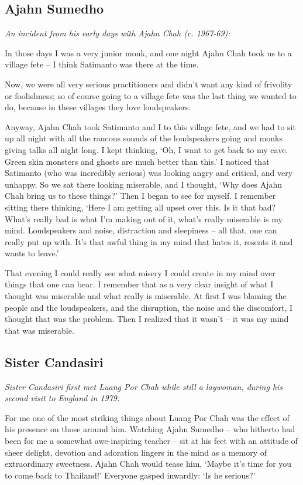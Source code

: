 \subsection{Ajahn Sumedho}

\emph{An incident from his early days with Ajahn Chah (c. 1967-69):}

In those days I was a very junior monk, and one night Ajahn Chah took us
to a village fete -- I think Satimanto was there at the time. 

Now, we were all very serious practitioners and didn't want any kind of
frivolity or foolishness; so of course going to a village fete was the
last thing we wanted to do, because in these villages they love
loudspeakers. 

Anyway, Ajahn Chah took Satimanto and I to this village fete, and we had
to sit up all night with all the raucous sounds of the loudspeakers
going and monks giving talks all night long. I kept thinking, `Oh, I
want to get back to my cave. Green skin monsters and ghosts are much
better than this.' I noticed that Satimanto (who was incredibly serious) 
was looking angry and critical, and very unhappy. So we sat there
looking miserable, and I thought, `Why does Ajahn Chah bring us to these
things?' Then I began to see for myself. I remember sitting there
thinking, `Here I am getting all upset over this. Is it that bad? What's
really bad is what I'm making out of it, what's really miserable is my
mind. Loudspeakers and noise, distraction and sleepiness -- all that, 
one can really put up with. It's that awful thing in my mind that hates
it, resents it and wants to leave.'

That evening I could really see what misery I could create in my mind
over things that one can bear. I remember that as a very clear insight
of what I thought was miserable and what really is miserable. At first I
was blaming the people and the loudspeakers, and the disruption, the
noise and the discomfort, I thought that was the problem. Then I
realized that it wasn't -- it was my mind that was miserable. 

\subsection{Sister Candasiri}

\emph{Sister Candasiri first met Luang Por Chah while still a
laywoman, during his second visit to England in 1979:}

For me one of the most striking things about Luang Por Chah was the
effect of his presence on those around him. Watching Ajahn Sumedho --
who hitherto had been for me a somewhat awe-inspiring teacher -- sit at
his feet with an attitude of sheer delight, devotion and adoration
lingers in the mind as a memory of extraordinary sweetness. Ajahn Chah
would tease him, `Maybe it's time for you to come back to Thailand!'
Everyone gasped inwardly: `Is he serious?'

